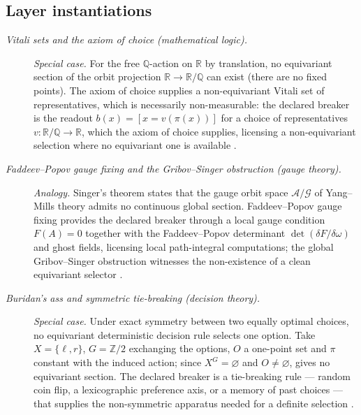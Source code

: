 \subsection*{Layer instantiations}\label{layer-inst:F15a}

\begingroup\small
\begin{description}
\item[\emph{Vitali sets and the axiom of choice (mathematical
logic).}] \textit{Special case.}
For the free \(\mathbb Q\)-action on \(\mathbb R\) by translation,
no equivariant section of the orbit projection
\(\mathbb R\to\mathbb R/\mathbb Q\) can exist (there are no fixed
points).  The axiom of choice supplies a non-equivariant Vitali
set of representatives, which is necessarily non-measurable: the
 declared breaker is the readout \(b(x)=[x=v(\pi(x))]\) for a choice of
representatives \(v:\mathbb R/\mathbb Q\to\mathbb R\), which the axiom of choice supplies, licensing a
non-equivariant selection where no equivariant one is available
\citep{Vitali1905ProblemaMisura}.

\item[\emph{Faddeev--Popov gauge fixing and the Gribov--Singer
obstruction (gauge theory).}] \textit{Analogy.}
Singer's theorem states that the gauge orbit space
\(\mathcal A/\mathcal G\) of Yang--Mills theory admits no
continuous global section.  Faddeev--Popov gauge fixing provides
the  declared breaker through a local gauge condition
\(F(A)=0\) together with the Faddeev--Popov determinant
\(\det(\delta F/\delta\omega)\) and ghost fields, licensing local
path-integral computations; the global Gribov--Singer obstruction
witnesses the non-existence of a clean equivariant selector
\citep{FaddeevPopov1967YangMills}.

\item[\emph{Buridan's ass and symmetric tie-breaking (decision
theory).}] \textit{Special case.}
Under exact symmetry between two equally optimal choices, no
equivariant deterministic decision rule selects one option.  Take
\(X=\{\ell,r\}\), \(G=\mathbb Z/2\) exchanging the options, \(O\) a one-point set
and \(\pi\) constant with the induced action; since \(X^G=\varnothing\) and
\(O\ne\varnothing\),  gives no equivariant section.  The
declared breaker is a tie-breaking rule --- random coin flip, a
lexicographic preference axis, or a memory of past choices --- that
supplies the non-symmetric apparatus needed for a definite
selection
\citep{Rescher1959ChoiceWithoutPreference}.
\end{description}
\endgroup


